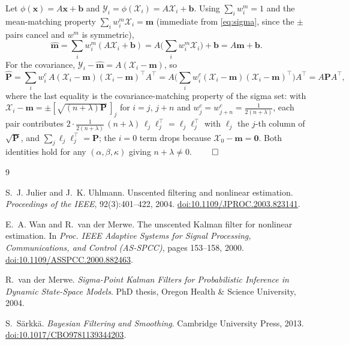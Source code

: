 \documentclass[11pt]{article}
\newcommand{\bx}{\bm{x}}
\newcommand{\bm}[1]{\boldsymbol{#1}}
\begin{document}
Let $\phi(\bx)=A\bx+\bm b$ and $\mathcal Y_i=\phi(\mathcal X_i)=A\mathcal X_i+\bm b$.
Using $\sum_i w_i^m=1$ and the mean-matching property $\sum_i w_i^m\mathcal X_i=\bm m$
(immediate from \eqref{eq:sigma}, since the $\pm$ pairs cancel and $w^m$ is symmetric),
\[
\hat{\bm m}=\sum_i w_i^m(A\mathcal X_i+\bm b)=A\Big(\sum_i w_i^m\mathcal X_i\Big)+\bm b
          =A\bm m+\bm b .
\]
For the covariance, $\mathcal Y_i-\hat{\bm m}=A(\mathcal X_i-\bm m)$, so
\[
\hat{\bm P}=\sum_i w_i^c\,A(\mathcal X_i-\bm m)(\mathcal X_i-\bm m)^\top A^\top
          =A\Big(\sum_i w_i^c(\mathcal X_i-\bm m)(\mathcal X_i-\bm m)^\top\Big)A^\top
          =A\bm P A^\top,
\]
where the last equality is the covariance-matching property of the sigma set: with
$\mathcal X_i-\bm m=\pm[\sqrt{(n+\lambda)\bm P}\,]_j$ for $i=j,\,j+n$ and
$w_j^c=w_{j+n}^c=\tfrac{1}{2(n+\lambda)}$, each pair contributes
$2\cdot\tfrac{1}{2(n+\lambda)}\,(n+\lambda)\,\ell_j\ell_j^\top=\ell_j\ell_j^\top$ with
$\ell_j$ the $j$-th column of $\sqrt{\bm P}$, and $\sum_j\ell_j\ell_j^\top=\bm P$; the
$i=0$ term drops because $\mathcal X_0-\bm m=\bm 0$. Both identities hold for any
$(\alpha,\beta,\kappa)$ giving $n+\lambda\neq0$. \hfill$\qed$

\begin{thebibliography}{9}

S.~J. Julier and J.~K. Uhlmann.
\newblock Unscented filtering and nonlinear estimation.
\newblock \emph{Proceedings of the IEEE}, 92(3):401--422, 2004.
\newblock \href{https://doi.org/10.1109/JPROC.2003.823141}{doi:10.1109/JPROC.2003.823141}.

E.~A. Wan and R.~van der Merwe.
\newblock The unscented Kalman filter for nonlinear estimation.
\newblock In \emph{Proc. IEEE Adaptive Systems for Signal Processing,
Communications, and Control (AS-SPCC)}, pages 153--158, 2000.
\newblock \href{https://doi.org/10.1109/ASSPCC.2000.882463}{doi:10.1109/ASSPCC.2000.882463}.

R.~van der Merwe.
\newblock \emph{Sigma-Point Kalman Filters for Probabilistic Inference in Dynamic
State-Space Models}.
\newblock PhD thesis, Oregon Health \& Science University, 2004.

S.~S\"arkk\"a.
\newblock \emph{Bayesian Filtering and Smoothing}.
\newblock Cambridge University Press, 2013.
\newblock \href{https://doi.org/10.1017/CBO9781139344203}{doi:10.1017/CBO9781139344203}.

\end{thebibliography}
\end{document}

